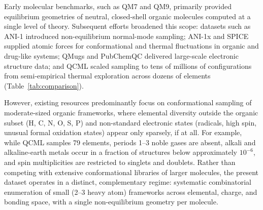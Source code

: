 \documentclass[fleqn,10pt]{article}
\begin{document}
Early molecular benchmarks, such as QM7\cite{QM7} and QM9\cite{QM9}, primarily provided equilibrium geometries of neutral, closed-shell organic molecules computed at a single level of theory. Subsequent efforts broadened this scope: datasets such as ANI-1\cite{smith2017ani} introduced non-equilibrium normal-mode sampling; ANI-1x\cite{smith2020ani} and SPICE\cite{eastman2023spice, spice2} supplied atomic forces for conformational and thermal fluctuations in organic and drug-like systems; QMugs\cite{qmugs} and PubChemQC\cite{pubchemqc, pubchemqc2023b3lyp} delivered large-scale electronic structure data; and QCML\cite{qcml} scaled sampling to tens of millions of configurations from semi-empirical thermal exploration across dozens of elements (Table~\ref{tab:comparison}).

However, existing resources predominantly focus on conformational sampling of moderate-sized organic frameworks, where elemental diversity outside the organic subset (H, C, N, O, S, P) and non-standard electronic states (radicals, high spin, unusual formal oxidation states) appear only sparsely, if at all. For example, while QCML samples 79 elements, periods 1--3 noble gases are absent, alkali and alkaline-earth metals occur in a fraction of structures below approximately $10^{-6}$, and spin multiplicities are restricted to singlets and doublets. Rather than competing with extensive conformational libraries of larger molecules, the present dataset operates in a distinct, complementary regime: systematic combinatorial enumeration of small (2--3 heavy atom) frameworks across elemental, charge, and bonding space, with a single non-equilibrium geometry per molecule.
\end{document}

